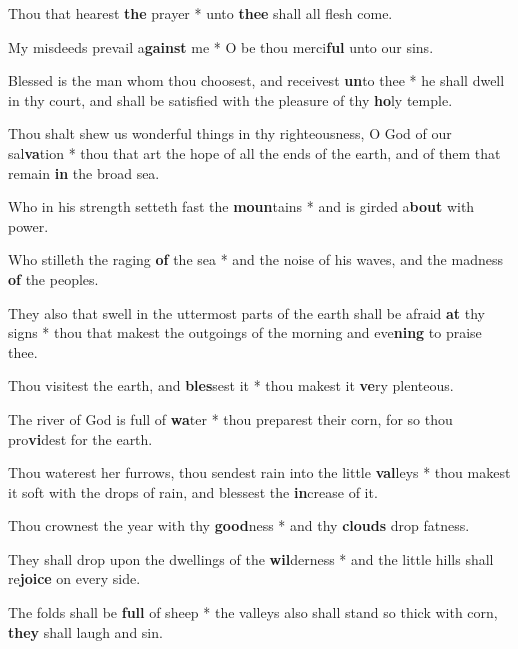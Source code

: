 \begin{multicols}{2}
	Thou that hearest \textbf{the} prayer * unto \textbf{thee} shall all flesh come.
	
	My misdeeds prevail a\textbf{gainst} me * O be thou merci\textbf{ful} unto our sins.
	
	Blessed is the man whom thou choosest, and receivest \textbf{un}to thee * he shall dwell in thy court, and shall be satisfied with the pleasure of thy \textbf{ho}ly temple.
	
	Thou shalt shew us wonderful things in thy righteousness, O God of our sal\textbf{va}tion * thou that art the hope of all the ends of the earth, and of them that remain \textbf{in} the broad sea.
	
	Who in his strength setteth fast the \textbf{moun}tains * and is girded a\textbf{bout} with power.
	
	Who stilleth the raging \textbf{of} the sea * and the noise of his waves, and the madness \textbf{of} the peoples.
	
	They also that swell in the uttermost parts of the earth shall be afraid \textbf{at} thy signs * thou that makest the outgoings of the morning and eve\textbf{ning} to praise thee.
	
	Thou visitest the earth, and \textbf{bles}sest it * thou makest it \textbf{ve}ry plenteous.
	
	The river of God is full of \textbf{wa}ter * thou preparest their corn, for so thou pro\textbf{vi}dest for the earth.
	
	Thou waterest her furrows, thou sendest rain into the little \textbf{val}leys * thou makest it soft with the drops of rain, and blessest the \textbf{in}crease of it.
	
	Thou crownest the year with thy \textbf{good}ness * and thy \textbf{clouds} drop fatness.
	
	They shall drop upon the dwellings of the \textbf{wil}derness * and the little hills shall re\textbf{joice} on every side.
	
	The folds shall be \textbf{full} of sheep * the valleys also shall stand so thick with corn, \textbf{they} shall laugh and sin.
\end{multicols}